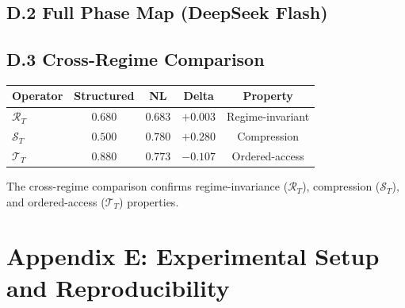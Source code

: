 \documentclass[letterpaper,twocolumn,10pt]{article}
\begin{document}
\subsection*{D.2 Full Phase Map (DeepSeek Flash)}
\begin{table}[h]
\centering
{}
\end{table}

\subsection*{D.3 Cross-Regime Comparison}
\begin{table}[h]
\centering\footnotesize
\begin{tabular}{lcccc}
\toprule
Operator & Structured & NL & Delta & Property\\
\midrule
$\mathcal{R}_T$ & $0.680$ & $0.683$ & $+0.003$ & Regime-invariant\\
$\mathcal{S}_T$ & $0.500$ & $0.780$ & $+0.280$ & Compression\\
$\mathcal{T}_T$ & $0.880$ & $0.773$ & $-0.107$ & Ordered-access\\
\bottomrule
\end{tabular}
\end{table}

The cross-regime comparison confirms regime-invariance ($\mathcal{R}_T$), compression ($\mathcal{S}_T$), and ordered-access ($\mathcal{T}_T$) properties.

\section*{Appendix E: Experimental Setup and Reproducibility}
\end{document}
